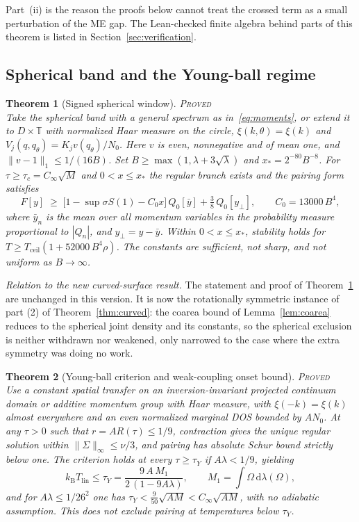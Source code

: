 \documentclass[11pt]{article}
\newcommand{\PROVED}{\upshape\mdseries\textsc{Proved}}
\newcommand{\Cinf}{C_\infty}
\newcommand{\kB}{k_{\mathrm B}}
\newcommand{\Tceil}{T_{\mathrm{ceil}}}
\newcommand{\Tlin}{T_{\mathrm{lin}}}
\newcommand{\dd}{\,\mathrm d}
\newcommand{\sS}{\sup\sigma S}
\newtheorem{theorem}{Theorem}[section]
\theoremstyle{definition}
\theoremstyle{remark}
\begin{document}
Part~(ii) is the reason the proofs below cannot treat the crossed term as a small perturbation of the ME gap. The Lean-checked finite algebra behind parts of this theorem is listed in Section~\ref{sec:verification}.

\subsection{Spherical band and the Young-ball regime}

\begin{theorem}[Signed spherical window]\label{thm:V3a}\hfill\PROVED\\
Take the spherical band with a general spectrum as in~\eqref{eq:moments}, or extend it to $D\times\mathbb T$ with normalized Haar measure on the circle, $\xi(k,\theta)=\xi(k)$ and $V_j(q,q_\theta)=K_jv(q_\theta)/N_0$. Here $v$ is even, nonnegative and of mean one, and $\|v-1\|_1\le1/(16B)$. Set $B\ge\max(1,\lambda+3\sqrt\lambda)$ and $x_*=2^{-80}B^{-8}$. For $\tau\ge\tau_c=\Cinf\sqrt M$ and $0<x\le x_*$ the regular branch exists and the pairing form satisfies
\begin{equation}\label{eq:V3a}
F[y]\;\ge\;\big[1-\sS(1)-C_0x\big]\,Q_0[\bar y]+\tfrac38\,Q_0[y_\perp],\qquad C_0=13000\,B^4,
\end{equation}
where $\bar y_n$ is the mean over all momentum variables in the probability measure proportional to $|Q_n|$, and $y_\perp=y-\bar y$. Within $0<x\le x_*$, stability holds for $T\ge\Tceil(1+52000\,B^4\rho)$. The constants are sufficient, not sharp, and not uniform as $B\to\infty$.
\end{theorem}

\noindent\emph{Relation to the new curved-surface result.} The statement and proof of Theorem~\ref{thm:V3a} are unchanged in this version. It is now the rotationally symmetric instance of part (2) of Theorem~\ref{thm:curved}: the coarea bound of Lemma~\ref{lem:coarea} reduces to the spherical joint density and its constants, so the spherical exclusion is neither withdrawn nor weakened, only narrowed to the case where the extra symmetry was doing no work.

\begin{theorem}[Young-ball criterion and weak-coupling onset bound]\label{thm:V3b}\hfill\PROVED\\
Use a constant spatial transfer on an inversion-invariant projected continuum domain or additive momentum group with Haar measure, with $\xi(-k)=\xi(k)$ almost everywhere and an even normalized marginal DOS bounded by $AN_0$. At any $\tau>0$ such that $r=AR(\tau)\le1/9$, contraction gives the unique regular solution within $\|\Sigma\|_\infty\le\nu/3$, and pairing has absolute Schur bound strictly below one. The criterion holds at every $\tau\ge\tau_Y$ if $A\lambda<1/9$, yielding
\begin{equation}\label{eq:V3b}
\kB\Tlin\le\tau_Y=\frac{9\,A\,M_1}{2\,(1-9A\lambda)},\qquad M_1=\int\Omega\dd\lambda(\Omega),
\end{equation}
and for $A\lambda\le1/26^2$ one has $\tau_Y<\tfrac{9}{50}\sqrt{AM}<\Cinf\sqrt{AM}$, with no adiabatic assumption. This does not exclude pairing at temperatures below $\tau_Y$.
\end{theorem}
\end{document}
